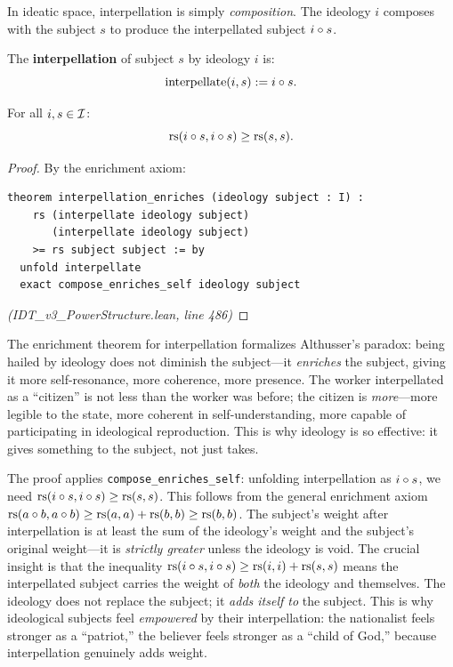 In ideatic space, interpellation is simply \emph{composition}. The ideology $i$
composes with the subject $s$ to produce the interpellated subject $i \circ s$.

\begin{definition}[Interpellation]
\label{def:interpellation}
The \textbf{interpellation} of subject $s$ by ideology $i$ is:
\[
  \mathrm{interpellate}(i, s) := i \circ s.
\]
\end{definition}

\begin{theorem}
\label{thm:interpellation-enriches}
For all $i, s \in \mathcal{I}$:
\[
  \mathrm{rs}(i \circ s, i \circ s) \geq \mathrm{rs}(s, s).
\]
\end{theorem}

\begin{proof}
By the enrichment axiom:
\begin{lstlisting}
theorem interpellation_enriches (ideology subject : I) :
    rs (interpellate ideology subject)
       (interpellate ideology subject)
    >= rs subject subject := by
  unfold interpellate
  exact compose_enriches_self ideology subject
\end{lstlisting}
\textit{(IDT\_v3\_PowerStructure.lean, line 486)}
\end{proof}

\begin{interpretation}
The enrichment theorem for interpellation formalizes Althusser's paradox: being
hailed by ideology does not diminish the subject---it \emph{enriches} the
subject, giving it more self-resonance, more coherence, more presence. The
worker interpellated as a ``citizen'' is not less than the worker was before;
the citizen is \emph{more}---more legible to the state, more coherent in
self-understanding, more capable of participating in ideological reproduction.
This is why ideology is so effective: it gives something to the subject, not
just takes.
\end{interpretation}

\begin{remark}
The proof applies \texttt{compose\_enriches\_self}: unfolding interpellation
as $i \circ s$, we need $\mathrm{rs}(i \circ s, i \circ s) \geq \mathrm{rs}(s,s)$.
This follows from the general enrichment axiom
$\mathrm{rs}(a \circ b, a \circ b) \geq \mathrm{rs}(a,a) + \mathrm{rs}(b,b) \geq \mathrm{rs}(b,b)$.
The subject's weight after interpellation is at least the sum of the
ideology's weight and the subject's original weight---it is \emph{strictly
greater} unless the ideology is void. The crucial insight is that the
inequality $\mathrm{rs}(i \circ s, i \circ s) \geq \mathrm{rs}(i,i) + \mathrm{rs}(s,s)$
means the interpellated subject carries the weight of \emph{both} the
ideology and themselves. The ideology does not replace the subject; it
\emph{adds itself to} the subject. This is why ideological subjects feel
\emph{empowered} by their interpellation: the nationalist feels stronger
as a ``patriot,'' the believer feels stronger as a ``child of God,''
because interpellation genuinely adds weight.
\end{remark}

